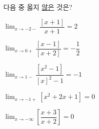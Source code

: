 다음 중 옳지 \underline{않은} 것은? 
\begin{choicesii}{\rule[-3ex]{0pt}{8ex}$\displaystyle\lim_{x\to-2-}\dfrac{[x+1]}{x+1}=2$}{\rule[-3ex]{0pt}{8ex}$\displaystyle\lim_{x\to 0+}\dfrac{[x-1]}{[x+2]}=-\dfrac{1}{2}$}{\rule[-3ex]{0pt}{8ex}$\displaystyle\lim_{x\to 1-}\dfrac{[x^2-1]}{[x]^2-1}=-1$}{\rule[-3ex]{0pt}{8ex}$\displaystyle\lim_{x\to-1+}[x^2+2x+1]=0$}{\rule[-3ex]{0pt}{8ex}$\displaystyle\lim_{x\to-\infty}\left[\dfrac{x+3}{x+2}\right]=0$}\end{choicesii}
